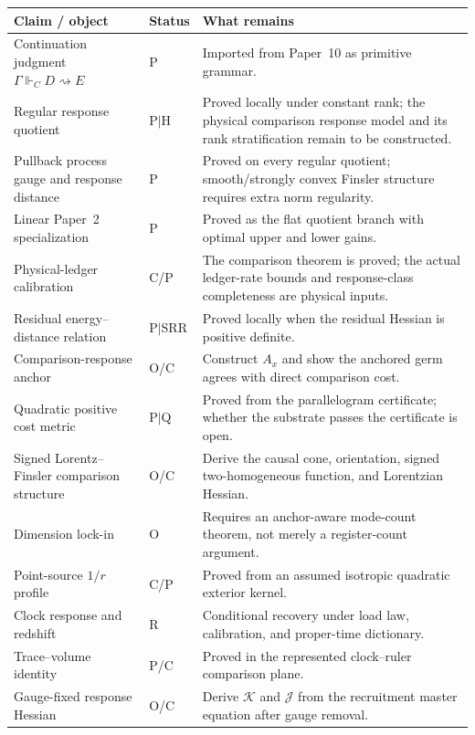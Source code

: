 \documentclass[11pt]{article}
\theoremstyle{remark}
\newcommand{\G}{\Gamma}
\newcommand{\entails}{\Vdash}
\newcommand{\goes}{\rightsquigarrow}
\newcommand{\Status}[1]{\textsf{#1}}
\begin{document}
\begin{longtable}{@{}p{}p{}p{}@{}}
\toprule
Claim / object & Status & What remains \\
\midrule
Continuation judgment $\G\entails_C D\goes E$ & \Status{P} & Imported from Paper~10 as primitive grammar. \\
Regular response quotient & \Status{P$\mid$H} & Proved locally under constant rank; the physical comparison response model and its rank stratification remain to be constructed. \\
Pullback process gauge and response distance & \Status{P} & Proved on every regular quotient; smooth/strongly convex Finsler structure requires extra norm regularity. \\
Linear Paper~2 specialization & \Status{P} & Proved as the flat quotient branch with optimal upper and lower gains. \\
Physical-ledger calibration & \Status{C/P} & The comparison theorem is proved; the actual ledger-rate bounds and response-class completeness are physical inputs. \\
Residual energy--distance relation & \Status{P$\mid$SRR} & Proved locally when the residual Hessian is positive definite. \\
Comparison-response anchor & \Status{O/C} & Construct $A_x$ and show the anchored germ agrees with direct comparison cost. \\
Quadratic positive cost metric & \Status{P$\mid$Q} & Proved from the parallelogram certificate; whether the substrate passes the certificate is open. \\
Signed Lorentz--Finsler comparison structure & \Status{O/C} & Derive the causal cone, orientation, signed two-homogeneous function, and Lorentzian Hessian. \\
Dimension lock-in & \Status{O} & Requires an anchor-aware mode-count theorem, not merely a register-count argument. \\
Point-source $1/r$ profile & \Status{C/P} & Proved from an assumed isotropic quadratic exterior kernel. \\
Clock response and redshift & \Status{R} & Conditional recovery under load law, calibration, and proper-time dictionary. \\
Trace--volume identity & \Status{P/C} & Proved in the represented clock--ruler comparison plane. \\
Gauge-fixed response Hessian & \Status{O/C} & Derive $\mathcal K$ and $\mathcal J$ from the recruitment master equation after gauge removal. \\

\end{longtable}
\end{document}
